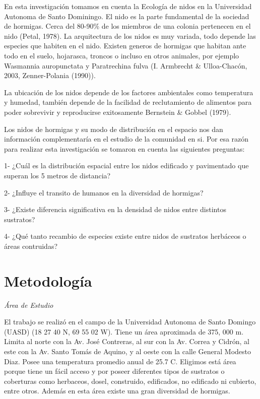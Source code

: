 \documentclass[11pt,]{article}
\begin{document}
En esta investigación tomamos en cuenta la Ecología de nidos en la
Universidad Autonoma de Santo Dominingo. El nido es la parte fundamental
de la sociedad de hormigas. Cerca del 80-90\% de los miembros de una
colonia pertenecen en el nido (Petal, 1978). La arquitectura de los
nidos es muy variada, todo depende las especies que habiten en el nido.
Existen generos de hormigas que habitan ante todo en el suelo,
hojarasca, troncos o incluso en otros animales, por ejemplo Wasmannia
auropunctata y Paratrechina fulva (I. Armbrecht \& Ulloa-Chacón, 2003,
Zenner-Polania (1990)).

La ubicación de los nidos depende de los factores ambientales como
temperatura y humedad, también depende de la facilidad de reclutamiento
de alimentos para poder sobrevivir y reproducirse exitosamente Bernstein
\& Gobbel (1979).

Los nidos de hormigas y su modo de distribución en el espacio nos dan
información complementaría en el estudio de la comunidad en si. Por esa
razón para realizar esta investigación se tomaron en cuenta las
siguientes preguntas:

1- ¿Cuál es la distribución espacial entre los nidos edificado y
pavimentado que superan los 5 metros de distancia?

2- ¿Influye el transito de humanos en la diversidad de hormigas?

3- ¿Existe diferencia significativa en la densidad de nidos entre
distintos sustratos?

4- ¿Qué tanto recambio de especies existe entre nidos de sustratos
herbáceos o áreas contruidas?

\section{Metodología}\label{metodologuxeda}

\emph{Área de Estudio}

El trabajo se realizó en el campo de la Universidad Autonoma de Santo
Domingo (UASD) (18 27 40 N, 69 55 02 W). Tiene un área aproximada de
375, 000 m. Limita al norte con la Av. José Contreras, al sur con la Av.
Correa y Cidrón, al este con la Av. Santo Tomás de Aquino, y al oeste
con la calle General Modesto Diaz. Posee una temperatura promedio anual
de 25.7 C. Eligimos está área porque tiene un fácil acceso y por poseer
diferentes tipos de sustratos o coberturas como herbaceos, dosel,
construido, edificados, no edificado ni cubierto, entre otros. Además en
esta área existe una gran diversidad de hormigas.
\end{document}
